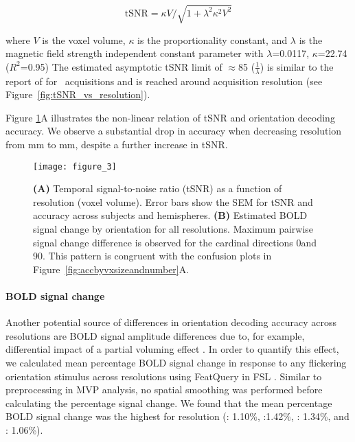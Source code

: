$$\text{tSNR}=\kappa  V / \sqrt{1+\lambda^2  \kappa^2  V^2}$$

\noindent where $V$ is the voxel volume, $\kappa$ is the proportionality constant, and
$\lambda$ is the magnetic field strength independent constant parameter with
$\lambda$=0.0117, $\kappa$=22.74 ($R^2$=0.95)  The estimated asymptotic tSNR
limit of $\approx$85 ($\frac{1}{\lambda}$) is similar to the report of
\citet{triantafyllou_2005} for \sevenT\ acquisitions and is reached around
 acquisition resolution (see Figure~\ref{fig:tSNR_vs_resolution}).

Figure \ref{fig:tsnrsigchange}A illustrates the non-linear relation of tSNR and
orientation decoding accuracy. We observe a substantial drop in accuracy when
decreasing resolution from \unit[2]{mm} to \unit[3]{mm}, despite a further
increase in tSNR.

\begin{figure}
  \centering
  \texttt{[image: figure\_3]}
  \caption{%
    \textbf{(A)} Temporal signal-to-noise ratio (tSNR) as a function of
    resolution (voxel volume). Error bars show the SEM for tSNR and
    accuracy across subjects and hemispheres.
    \textbf{(B)} Estimated BOLD signal change by orientation for all
    resolutions. Maximum pairwise signal change difference is observed
    for the cardinal directions 0\textdegree and 90\textdegree. This
    pattern is congruent with the confusion plots in
    Figure~\ref{fig:accbyvxsizeandnumber}A.}

    \label{fig:tsnrsigchange}
\end{figure}


\paragraph*{BOLD signal change}

Another potential source of differences in orientation decoding accuracy across
resolutions are BOLD signal amplitude differences due to, for example,
differential impact of a partial voluming effect \citep[see][]{tong_2012,
alink_2013}. In order to quantify this effect, we calculated mean percentage
BOLD signal change in response to any flickering orientation stimulus across
resolutions using FeatQuery in FSL \citep[v5.0.8; ][]{Smith_2004}. Similar to 
preprocessing in MVP analysis, no spatial smoothing was performed before 
calculating the percentage signal change. We found
that the mean percentage BOLD signal change was the highest for  resolution 
(: 1.10\%, :1.42\%, : 1.34\%, and : 1.06\%).

